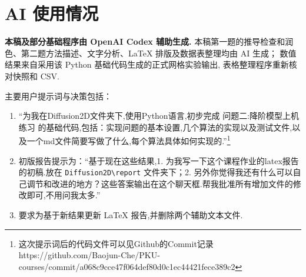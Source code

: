 \documentclass[UTF8,a4paper,11pt,fontset=fandol]{ctexart}
\numberwithin{equation}{section}
\begin{document}
\section{AI 使用情况}
\textbf{本稿及部分基础程序由 OpenAI Codex 辅助生成.}
本稿第一题的推导检查和润色、第二题方法描述、文字分析、LaTeX 排版及数据表整理均由 AI 生成；
数值结果来自采用该 Python 基础代码生成的正式网格实验输出, 表格整理程序重新核对快照和 CSV.

主要用户提示词与决策包括：
\begin{enumerate}
 \item ``为我在Diffusion2D文件夹下,使用Python语言,初步完成 问题二:降阶模型上机练习 的基础代码,包括：实现问题的基本设置,几个算法的实现以及测试文件,以及一个md文件简要写做了什么,每个算法具体如何实现的.''\footnote{这次提示词后的代码文件可以见Github的Commit记录 https://github.com/Baojun-Che/PKU-courses/commit/a068c9cce47f064def80d0c1ec44421fece389c2 } 
 \item 初版报告提示为：``基于现在这些结果,1. 为我写一下这个课程作业的latex报告的初稿.放在
 \texttt{Diffusion2D\textbackslash report} 文件夹下；2. 另外你觉得我还有什么可以自己调节和改进的地方？这些答案输出在这个聊天框.帮我批准所有增加文件的修改即可,不用问我太多.''
 \item 要求为基于新结果更新 LaTeX 报告,并删除两个辅助文本文件.
\end{enumerate}

\end{document}
